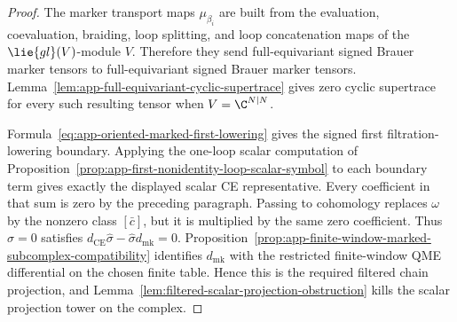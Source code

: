 \begin{proof}
  The marker transport maps \(\mu_{\beta_i}\) are built from the
  evaluation, coevaluation, braiding, loop splitting, and loop
  concatenation maps of the \(\lie{gl}(V)\)-module \(V\).  Therefore they
  send full-equivariant signed Brauer marker tensors to full-equivariant
  signed Brauer marker tensors.  Lemma~\ref{lem:app-full-equivariant-cyclic-supertrace}
  gives zero cyclic supertrace for every such resulting tensor when
  \(V=\C^{N|N}\).

  Formula~\eqref{eq:app-oriented-marked-first-lowering} gives the
  signed first filtration-lowering boundary.  Applying the one-loop
  scalar computation of
  Proposition~\ref{prop:app-first-nonidentity-loop-scalar-symbol} to each
  boundary term gives exactly the displayed scalar CE representative.
  Every coefficient in that sum is zero by the preceding paragraph.
  Passing to cohomology replaces \(\omega\) by the nonzero class
  \([\bar c]\), but it is multiplied by the same zero coefficient.  Thus
  \(\widehat\sigma=0\) satisfies
  \(d_{\mathrm{CE}}\widehat\sigma-\widehat\sigma d_{\mathrm{mk}}=0\).
  Proposition~\ref{prop:app-finite-window-marked-subcomplex-compatibility}
  identifies \(d_{\mathrm{mk}}\) with the restricted finite-window QME
  differential on the chosen finite table.  Hence this is the required
  filtered chain projection, and
  Lemma~\ref{lem:filtered-scalar-projection-obstruction} kills the scalar
  projection tower on the complex.
\end{proof}

